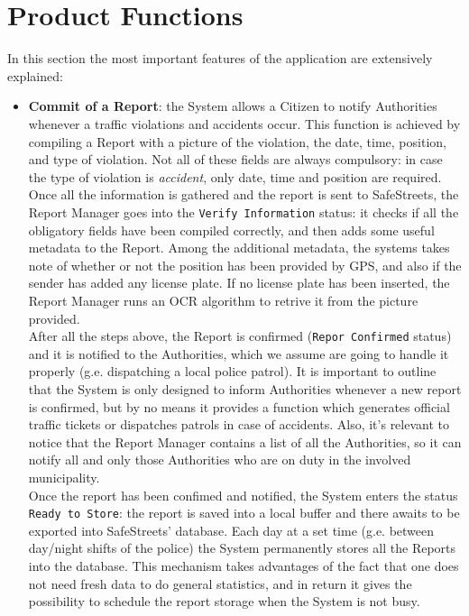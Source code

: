\documentclass{report}
\begin{document}
\newpage
\section{Product Functions}
In this section the most important features of the application are extensively explained:
\begin{itemize}
	\item \textbf{Commit of a Report}: the System allows a Citizen to notify Authorities whenever a traffic violations and accidents occur. This function is achieved by compiling a Report with a picture of the violation, the date, time, position, and type of violation. Not all of these fields are always compulsory: in case the type of violation is \textit{accident}, only date, time and position are required. Once all the information is gathered and the report is sent to SafeStreets, the Report Manager goes into the \texttt{Verify Information} status: it checks if all the obligatory fields have been compiled correctly, and then adds some useful metadata to the Report. Among the additional metadata, the systems takes note of whether or not the position has been provided by GPS, and also if the sender has added any license plate. If no license plate has been inserted, the Report Manager runs an OCR algorithm to retrive it from the picture provided. \\
	After all the steps above, the Report is confirmed (\texttt{Repor Confirmed} status) and it is notified to the Authorities, which we assume are going to handle it properly (g.e. dispatching a local police patrol). It is important to outline that the System is only designed to inform Authorities whenever a new report is confirmed, but by no means it provides a function which generates official traffic tickets or dispatches patrols in case of accidents. Also, it's relevant to notice that the Report Manager contains a list of all the Authorities, so it can notify all and only those Authorities who are on duty in the involved municipality. \\
	Once the report has been confimed and notified, the System enters the status \texttt{Ready to Store}: the report is saved into a local buffer and there awaits to be exported into SafeStreets' database. Each day at a set time (g.e. between day/night shifts of the police) the System permanently stores all the Reports into the database. This mechanism takes advantages of the fact that one does not need fresh data to do general statistics, and in return it gives the possibility to schedule the report storage when the System is not busy.


\end{itemize}
\end{document}
